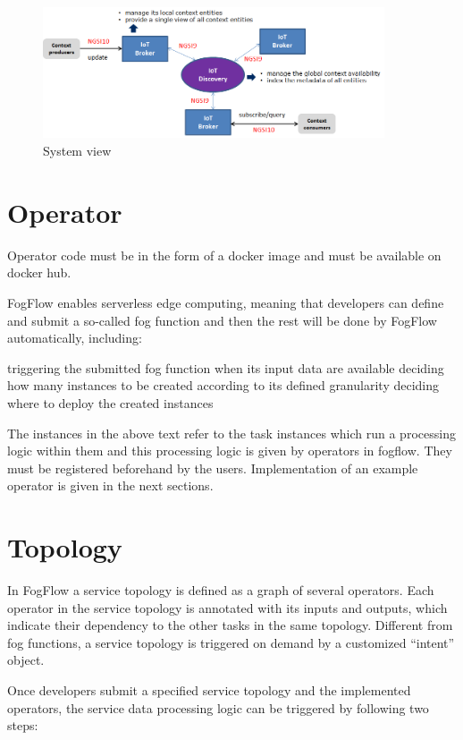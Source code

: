 \documentclass[conference]{ieeeconf}
\begin{document}
    \begin{figure}[h]
        \centering
        \includegraphics[width=0.9\textwidth]{Images/distributed-brokers.png}
        \caption{System view}
    \end{figure}{}


    \section{Operator}
    Operator code must be in the form of a docker image and must be available on docker hub.

    FogFlow enables serverless edge computing, meaning that developers can define and submit a so-called fog function and then the rest will be done by FogFlow automatically, including:

    triggering the submitted fog function when its input data are available
    deciding how many instances to be created according to its defined granularity
    deciding where to deploy the created instances

    The instances in the above text refer to the task instances which run a processing logic within them and this processing logic is given by operators in fogflow. They must be registered beforehand by the users. Implementation of an example operator is given in the next sections.


    \section{Topology}
    In FogFlow a service topology is defined as a graph of several operators. Each operator in the service topology is annotated with its inputs and outputs, which indicate their dependency to the other tasks in the same topology. Different from fog functions, a service topology is triggered on demand by a customized “intent” object.

    Once developers submit a specified service topology and the implemented operators, the service data processing logic can be triggered by following two steps:
\end{document}
